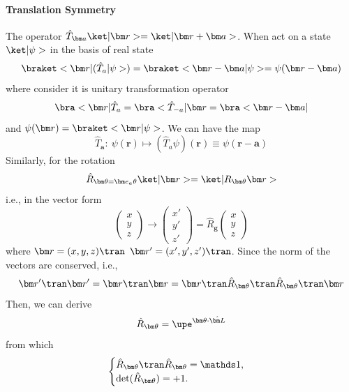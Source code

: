 \paragraph{Translation Symmetry}

The operator $\hat T_{\bm a} \ket|\bm r> = \ket|\bm r + \bm a>$.
When act on a state $\ket|\psi>$ in the basis of real state
\begin{equation}
  \braket<\bm r|(\hat T_a|\psi>) = \braket<\bm r - \bm a|\psi>
= \psi(\bm r - \bm a)
\end{equation}
where consider it is unitary transformation operator
\[
  \bra<\bm r|\hat T_a = \bra<\hat T_{-a}| \bm r = \bra<\bm r - \bm a|
\]
and $\psi(\bm r) = \braket<\bm r|\psi>$. We can have the map
\begin{equation}
  \hat T_{\bm a}:\ \psi(\bm r) \longmapsto (\hat T_a\psi)(\bm r)
  \equiv \psi(\bm r - \bm a)
\end{equation}
Similarly, for the rotation
\begin{equation}
  \hat R_{\bm\theta = \bm e_a\theta} \ket|\bm r> = \ket|R_{\bm\theta} \bm r>
\end{equation}
i.e., in the vector form
\[
  \begin{pmatrix}
    x\\y\\z
  \end{pmatrix} \to
  \begin{pmatrix}
    x'\\y'\\z'
  \end{pmatrix} = \hat R_{\bm g}
  \begin{pmatrix}
    x\\y\\z
  \end{pmatrix}
\]
where $\bm r = (x, y, z)\tran$ $\bm r' = (x',y',z')\tran$.
Since the norm of the vectors are conserved, i.e.,
\begin{equation}
  {\bm r'}\tran\bm r' = \bm r\tran\bm r
= \bm r\tran\hat R_{\bm\theta}\tran\hat R_{\bm\theta}\tran \bm r
\end{equation}
Then, we can derive
\begin{equation}
  \hat R_{\bm\theta} = \upe^{\bm\theta \cdot \hat{\bm L}}
\end{equation}
from which
\[
  \begin{cases}
    \hat R_{\bm\theta}\tran \hat R_{\bm\theta} = \identity,\\
    \det(\hat R_{\bm\theta}) = +1.
  \end{cases}
\]
